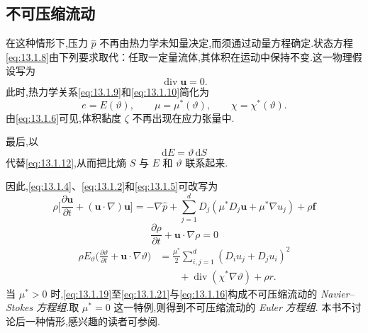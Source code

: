 \subsection{不可压缩流动}\label{sec:13.1.2}

在这种情形下,压力 \(\widehat p\) 不再由热力学未知量决定,而须通过动量方程确定.状态方程\eqref{eq:13.1.8}由下列要求取代：任取一定量流体,其体积在运动中保持不变.这一物理假设写为
\begin{equation}\label{eq:13.1.16}
  \operatorname{div}\boldsymbol{u}=0.
\end{equation}
此时,热力学关系\eqref{eq:13.1.9}和\eqref{eq:13.1.10}简化为
\begin{equation}\label{eq:13.1.17}
  e=E(\vartheta),\qquad\mu=\mu^*(\vartheta),\qquad\chi=\chi^*(\vartheta).
\end{equation}
由\eqref{eq:13.1.6}可见,体积黏度 \(\zeta\) 不再出现在应力张量中.

最后,以
\begin{equation}\label{eq:13.1.18}
  \mathrm dE=\vartheta\,\mathrm dS
\end{equation}
代替\eqref{eq:13.1.12},从而把比熵 \(S\) 与 \(E\) 和 \(\vartheta\) 联系起来.

因此,\eqref{eq:13.1.4}、\eqref{eq:13.1.2}和\eqref{eq:13.1.5}可改写为
\begin{equation}\label{eq:13.1.19}
  \rho\biggl[\frac{\partial\boldsymbol{u}}{\partial t}
    +(\boldsymbol{u}\cdot\nabla)\boldsymbol{u}\biggr]
     =-\nabla\widehat p+\sum_{j=1}^d D_j(\mu^*D_j\boldsymbol{u}+\mu^*\nabla u_j)+\rho\boldsymbol{f}
\end{equation}
\begin{equation}\label{eq:13.1.20}
  \frac{\partial\rho}{\partial t}+\boldsymbol{u}\cdot\nabla\rho=0
\end{equation}
\begin{equation}\label{eq:13.1.21}
  \begin{aligned}
    \rho E_\vartheta\biggl(\frac{\partial\vartheta}{\partial t}
      +\boldsymbol{u}\cdot\nabla\vartheta\biggr)
      &=\frac{\mu^*}{2}\sum_{i,j=1}^d(D_i u_j+D_j u_i)^2\\
      &\qquad+\operatorname{div}(\chi^*\nabla\vartheta)+\rho r.
  \end{aligned}
\end{equation}
当 \(\mu^*>0\) 时,\eqref{eq:13.1.19}至\eqref{eq:13.1.21}与\eqref{eq:13.1.16}构成不可压缩流动的 \emph{Navier--Stokes 方程组}.取 \(\mu^*=0\) 这一特例,则得到不可压缩流动的 \emph{Euler 方程组}.
本书不讨论后一种情形,感兴趣的读者可参阅.

